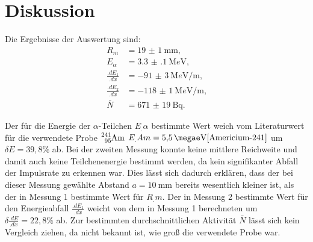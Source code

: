 
\section{Diskussion}
\label{sec:Diskussion}

Die Ergebnisse der Auswertung sind:
\begin{align*}
R_m			&= \SI{19(1)}{\milli\metre}\text{,}\\
E_\alpha 	&= \SI{3.3(1)}{\mega e\volt}\text{,}\\
\frac{.dE_1}{.dx}	&= \SI{-91(3)}{\mega e\volt\per\metre}\text{,}\\
\frac{.dE_2}{.dx}	&= \SI{-118(1)}{\mega e\volt\per\metre}\text{,}\\
\bar{N}		&= \SI{671(19)}{\becquerel} \text{.}
\end{align*}

Der für die Energie der $\alpha$-Teilchen $E_.{\alpha}$ bestimmte Wert weich vom Literaturwert für die verwendete Probe $\ce{^{241}_{95}Am}$
$E_.{Am}=\SI{5.5}{\megae\volt}\cite{Americium-241}$ um $\delta E = 39,8 \%$ ab.
Bei der zweiten Messung konnte keine mittlere Reichweite und damit auch keine Teilchenenergie bestimmt werden, da kein signifikanter Abfall der Impulsrate zu erkennen war. Dies lässt sich dadurch erklären, dass der bei dieser Messung gewählte Abstand $a=\SI{10}{\milli\metre}$ bereits wesentlich kleiner ist, als der in Messung 1 bestimmte Wert für $R_.m$.
Der in Messung 2 bestimmte Wert für den Energieabfall $\frac{.dE_1}{.dx}$ weicht von dem in Messung 1 berechneten um $\delta \frac{.dE}{.dx}= 22,8\%$ ab.
Zur bestimmten durchschnittlichen Aktivität $\bar{N}$ lässt sich kein Vergleich ziehen, da nicht bekannt ist, wie groß die verwendete Probe war.